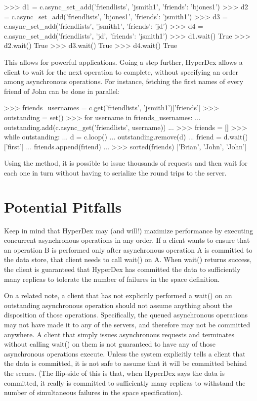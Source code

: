 \begin{pythoncode}
>>> d1 = c.async_set_add('friendlists', 'jsmith1', {'friends': 'bjones1'})
>>> d2 = c.async_set_add('friendlists', 'bjones1', {'friends': 'jsmith1'})
>>> d3 = c.async_set_add('friendlists', 'jsmith1', {'friends': 'jd'})
>>> d4 = c.async_set_add('friendlists', 'jd', {'friends': 'jsmith1'})
>>> d1.wait()
True
>>> d2.wait()
True
>>> d3.wait()
True
>>> d4.wait()
True
\end{pythoncode}

This allows for powerful applications.  Going a step further, HyperDex allows a
client to wait for the next operation to complete, without specifying an order
among asynchronous operations.  For instance, fetching the first names of every
friend of John can be done in parallel:

\begin{pythoncode}
>>> friends_usernames = c.get('friendlists', 'jsmith1')['friends']
>>> outstanding = set()
>>> for username in friends_usernames:
...     outstanding.add(c.async_get('friendlists', username))
...
>>> friends = []
>>> while outstanding:
...     d = c.loop()
...     outstanding.remove(d)
...     friend = d.wait()['first']
...     friends.append(friend)
...
>>> sorted(friends)
['Brian', 'John', 'John']
\end{pythoncode}

Using the  method, it is possible to issue thousands of requests
and then wait for each one in turn without having to serialize the round trips
to the server.

\section{Potential Pitfalls}
\label{sec:async-ops:pitfalls}

Keep in mind that HyperDex may (and will!) maximize performance by executing
concurrent asynchronous operations in any order.  If a client wants to ensure
that an operation B is performed only after asynchronous operation A is
committed to the data store, that client needs to call wait() on A. When wait()
returns success, the client is guaranteed that HyperDex has committed the data
to sufficiently many replicas to tolerate the number of failures in the space
definition.

On a related note, a client that has not explicitly performed a wait() on an
outstanding asynchronous operation should not assume anything about the
disposition of those operations. Specifically, the queued asynchronous
operations may not have made it to any of the servers, and therefore may not be
committed anywhere. A client that simply issues asynchronous requests and
terminates without calling wait() on them is not guaranteed to have any of those
asynchronous operations execute. Unless the system explicitly tells a client
that the data is committed, it is not safe to assume that it will be committed
behind the scenes. (The flip-side of this is that, when HyperDex says the data
is committed, it really is committed to sufficiently many replicas to withstand
the number of simultaneous failures in the space specification).


